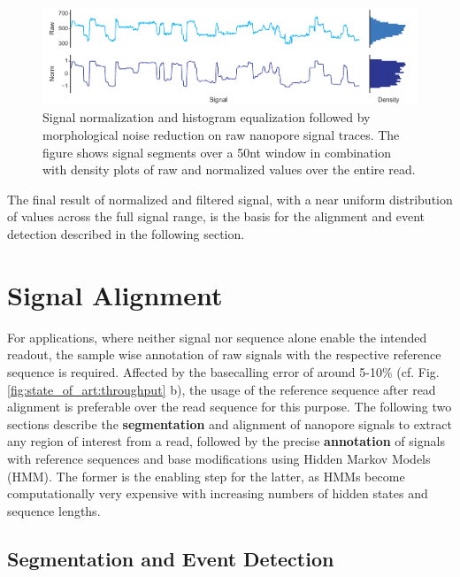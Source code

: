 \begin{figure}[h]
	\centering
	\includegraphics[width=1.0\textwidth]{figures/signal/normalization.pdf}
	\captionsetup{format=plain}
	\caption[Signal normalization and histogram equalization]{Signal normalization and histogram equalization followed by morphological noise reduction on raw nanopore signal traces. The figure shows signal segments over a 50nt window in combination with density plots of raw and normalized values over the entire read.}
	\label{fig:signal:normalization}
\end{figure}

The final result of normalized and filtered signal, with a near uniform distribution of values across the full signal range, is the basis for the alignment and event detection described in the following section.




\section{Signal Alignment}
\label{sec:signal:alignment}

For applications, where neither signal nor sequence alone enable the intended readout, the sample wise annotation of raw signals with the respective reference sequence is required. Affected by the basecalling error of around 5-10\% (cf. Fig. \ref{fig:state_of_art:throughput} b), the usage of the reference sequence after read alignment is preferable over the read sequence for this purpose. The following two sections describe the \textbf{segmentation} and alignment of nanopore signals to extract any region of interest from a read, followed by the precise \textbf{annotation} of signals with reference sequences and base modifications using Hidden Markov Models (HMM). The former is the enabling step for the latter, as HMMs become computationally very expensive with increasing numbers of hidden states and sequence lengths.




\subsection{Segmentation and Event Detection}
\label{subsec:signal:segmentation}

